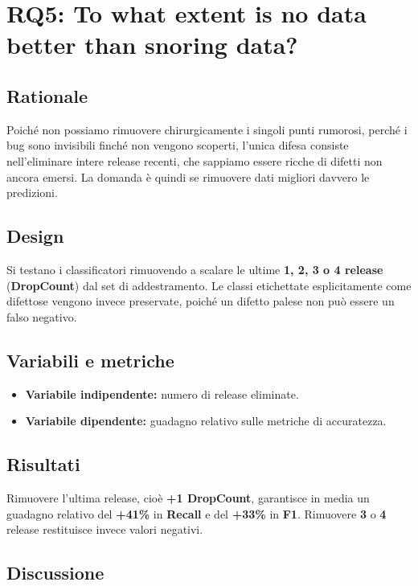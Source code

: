 \section{RQ5: To what extent is no data better than snoring data?}

\subsection{Rationale}

Poiché non possiamo rimuovere chirurgicamente i singoli punti rumorosi, perché i bug sono invisibili finché non vengono scoperti, l'unica difesa consiste nell'eliminare intere release recenti, che sappiamo essere ricche di difetti non ancora emersi. La domanda è quindi se rimuovere dati migliori davvero le predizioni.

\subsection{Design}

Si testano i classificatori rimuovendo a scalare le ultime \textbf{1, 2, 3 o 4 release} (\textbf{DropCount}) dal set di addestramento. Le classi etichettate esplicitamente come difettose vengono invece preservate, poiché un difetto palese non può essere un falso negativo.

\subsection{Variabili e metriche}

\begin{itemize}
    \item \textbf{Variabile indipendente:} numero di release eliminate.
    \item \textbf{Variabile dipendente:} guadagno relativo sulle metriche di accuratezza.
\end{itemize}

\subsection{Risultati}

Rimuovere l'ultima release, cioè \textbf{+1 DropCount}, garantisce in media un guadagno relativo del \textbf{+41\%} in \textbf{Recall} e del \textbf{+33\%} in \textbf{F1}. Rimuovere \textbf{3} o \textbf{4} release restituisce invece valori negativi.

\subsection{Discussione}

